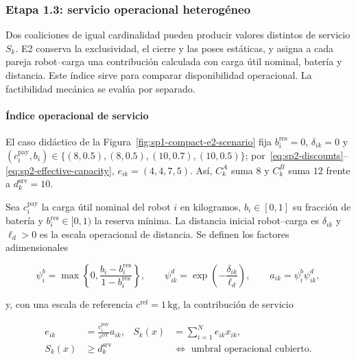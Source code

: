 \subsubsection{Etapa 1.3: servicio operacional heterogéneo}
\label{subsubsec:sp1-heterogeneity}

Dos coaliciones de igual cardinalidad pueden producir valores distintos de servicio $S_k$. E2 conserva la exclusividad, el cierre y las poses estáticas, y asigna a cada pareja robot--carga una contribución calculada con carga útil nominal, batería y distancia. Este índice sirve para comparar disponibilidad operacional. La factibilidad mecánica se evalúa por separado.

\paragraph{Índice operacional de servicio}

El caso didáctico de la Figura~\ref{fig:sp1-compact-e2-scenario} fija $b_i^{\mathrm{res}}=0$, $\delta_{ik}=0$ y $(c_i^{\mathrm{pay}},b_i)\in\{(8,0.5),(8,0.5),(10,0.7),(10,0.5)\}$; por~\eqref{eq:sp2-discounts}--\eqref{eq:sp2-effective-capacity}, $e_{ik}=(4,4,7,5)$. Así, $C_k^A$ suma $8$ y $C_k^B$ suma $12$ frente a $d_k^{\mathrm{srv}}=10$.


Sea $c_i^{\mathrm{pay}}$ la carga útil nominal del robot $i$ en kilogramos, $b_i\in[0, 1]$ su fracción de batería y $b_i^{\mathrm{res}}\in[0, 1)$ la reserva mínima. La distancia inicial robot--carga es $\delta_{ik}$ y $\ell_d>0$ es la escala operacional de distancia. Se definen los factores adimensionales

\begin{equation}
\label{eq:sp2-discounts}
  \psi_i^b=\max\!\left\{0,\frac{b_i-b_i^{\mathrm{res}}}{1-b_i^{\mathrm{res}}}\right\},
  \qquad
  \psi_{ik}^d=\exp\!\left(-\frac{\delta_{ik}}{\ell_d}\right),
  \qquad
  a_{ik}=\psi_i^b\psi_{ik}^d,
\end{equation}

y, con una escala de referencia $c^{\mathrm{ref}}=1\,\mathrm{kg}$, la contribución de servicio

\begin{equation}
\label{eq:sp2-effective-capacity}
  \begin{aligned}
    e_{ik}&=\frac{c_i^{\mathrm{pay}}}{c^{\mathrm{ref}}}a_{ik},
    & S_k(x)&=\sum_{i=1}^{N}e_{ik}x_{ik},\\
    S_k(x)&\geq d_k^{\mathrm{srv}}
    &&\Longleftrightarrow \text{ umbral operacional cubierto}.
  \end{aligned}
\end{equation}

